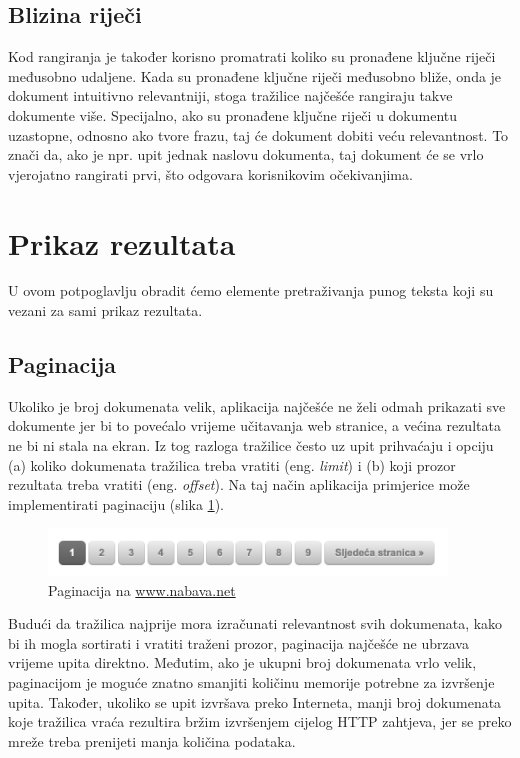 \documentclass[a4paper,twoside,12pt]{scrreprt}
\begin{document}
\subsection{Blizina riječi}

Kod rangiranja je također korisno promatrati koliko su pronađene ključne riječi međusobno udaljene. Kada su pronađene ključne riječi međusobno bliže, onda je dokument intuitivno relevantniji, stoga tražilice najčešće rangiraju takve dokumente više. Specijalno, ako su pronađene ključne riječi u dokumentu uzastopne, odnosno ako tvore frazu, taj će dokument dobiti veću relevantnost. To znači da, ako je npr. upit jednak naslovu dokumenta, taj dokument će se vrlo vjerojatno rangirati prvi, što odgovara korisnikovim očekivanjima.

\section{Prikaz rezultata}

U ovom potpoglavlju obradit ćemo elemente pretraživanja punog teksta koji su vezani za sami prikaz rezultata.

\subsection{Paginacija}

Ukoliko je broj dokumenata velik, aplikacija najčešće ne želi odmah prikazati sve dokumente jer bi to povećalo vrijeme učitavanja web stranice, a većina rezultata ne bi ni stala na ekran. Iz tog razloga tražilice često uz upit prihvaćaju i opciju (a) koliko dokumenata tražilica treba vratiti (eng. \textit{limit}) i (b) koji prozor rezultata treba vratiti (eng. \textit{offset}). Na taj način aplikacija primjerice može implementirati paginaciju (slika \ref{pagination}).

\begin{figure}[H]
  \centering
  \includegraphics[width=300pt]{pagination}
  \caption{Paginacija na \url{www.nabava.net}}
  \label{pagination}
\end{figure}

Budući da tražilica najprije mora izračunati relevantnost svih dokumenata, kako bi ih mogla sortirati i vratiti traženi prozor, paginacija najčešće ne ubrzava vrijeme upita direktno. Međutim, ako je ukupni broj dokumenata vrlo velik, paginacijom je moguće znatno smanjiti količinu memorije potrebne za izvršenje upita. Također, ukoliko se upit izvršava preko Interneta, manji broj dokumenata koje tražilica vraća rezultira bržim izvršenjem cijelog HTTP zahtjeva, jer se preko mreže treba prenijeti manja količina podataka.
\end{document}
